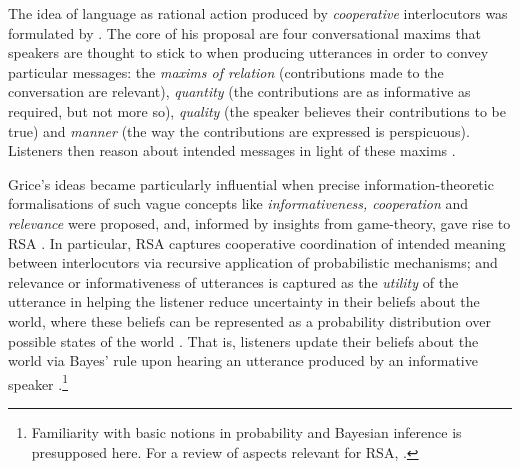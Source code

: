 The idea of language as rational action produced by \emph{cooperative} interlocutors was formulated by \textcite{grice1975logic}. The core of his proposal are four conversational maxims that speakers are thought to stick to when producing utterances in order to convey particular messages: the \emph{maxims of relation} (contributions made to the conversation are relevant), \emph{quantity} (the contributions are as informative as required, but not more so), \emph{quality} (the speaker believes their contributions to be true) and \emph{manner} (the way the contributions are expressed is perspicuous). Listeners then reason about intended messages in light of these maxims \parencite{grice1975logic}.

Grice’s ideas became particularly influential when precise information-theoretic formalisations of such vague concepts like \emph{informativeness, cooperation} and \emph{relevance} were proposed, and, informed by insights from game-theory, gave rise to RSA \parencite{frank2012predicting}.
In particular, RSA captures cooperative coordination of intended meaning between interlocutors via recursive application of probabilistic mechanisms; and relevance or informativeness of utterances is captured as the \emph{utility} of the utterance in helping the listener reduce uncertainty in their beliefs about the world, where these beliefs can be represented as a probability distribution over possible states of the world \parencite[as advocated by e.g.][]{tenenbaum2011grow}.  
That is, listeners update their beliefs about the world via Bayes' rule upon hearing an utterance produced by an informative speaker \parencite{frank2012predicting}.\footnote{Familiarity with basic notions in probability and Bayesian inference is presupposed here. For a review of aspects relevant for RSA, \textcite[see e.g.][]{lassiter2017adjectival}.}


